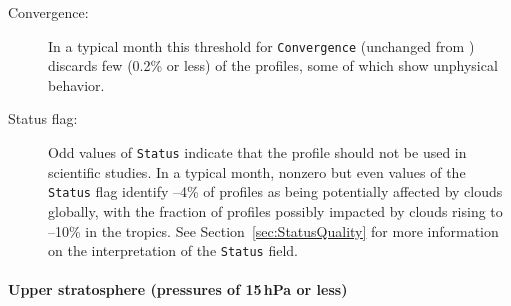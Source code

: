 \begin{nofloatpages}
\begin{description}
  \item[Convergence:]  In a typical month this threshold for \texttt{Convergence} (unchanged from \prevv) discards few (0.2\% or less) of the  profiles, some of which show unphysical behavior.


  \item[Status flag:]  Odd values of \texttt{Status} indicate that the profile should not be used in scientific studies. In a typical month, nonzero but even values of the \texttt{Status} flag identify --4\% of  profiles as being potentially affected by clouds globally, with the fraction of  profiles possibly impacted by clouds rising to –10\% in the tropics. See Section~\ref{sec:StatusQuality} for more information on the interpretation of the \texttt{Status} field.
\end{description}

\paragraph{Upper stratosphere (pressures of 15\,hPa or less)}


\end{nofloatpages}
